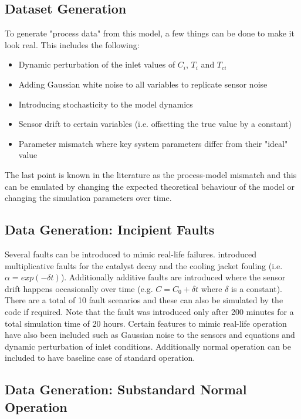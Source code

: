 \documentclass{article}
\begin{document}
\subsection{Dataset Generation}

To generate "process data" from this model, a few things can be done to make it look real. This includes the following:

\begin{itemize}
	\item Dynamic perturbation of the inlet values of $C_i$, $T_i$ and $T_{ci}$
	\item Adding Gaussian white noise to all variables to replicate sensor noise
	\item Introducing stochasticity to the model dynamics
	\item Sensor drift to certain variables (i.e. offsetting the true value by a constant)
	\item Parameter mismatch where key system parameters differ from their "ideal" value
\end{itemize}

The last point is known in the literature as the process-model mismatch and this can be emulated by changing the expected theoretical behaviour of the model or changing the simulation parameters over time.  

\subsection{Data Generation: Incipient Faults}

Several faults can be introduced to mimic real-life failures. \cite{pilario2018canonical} introduced multiplicative faults for the catalyst decay and the cooling jacket fouling (i.e. $\alpha = exp(-\delta t)$). Additionally additive faults are introduced where the sensor drift happens occasionally over time (e.g. $C=C_0 + \delta t$ where $\delta$ is a constant). There are a total of 10 fault scenarios and these can also be simulated by the code if required. Note that the fault was introduced only after 200 minutes for a total simulation time of 20 hours. Certain features to mimic real-life operation have also been included such as Gaussian noise to the sensors and equations and dynamic perturbation of inlet conditions. Additionally normal operation can be included to have baseline case of standard operation.

\subsection{Data Generation: Substandard Normal Operation}
\label{sec:substandard}
\end{document}
